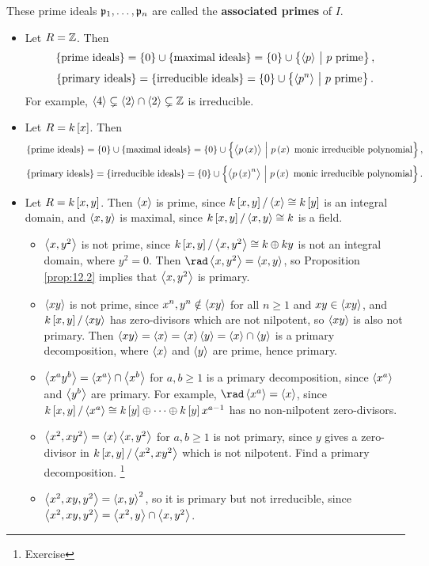 \begin{remark*}
These prime ideals $ \mathfrak{p}_1, \dots, \mathfrak{p}_n $ are called the \textbf{associated primes} of $ I $.
\end{remark*}

\begin{example*}
\hfill
\begin{itemize}
\item Let $ R = \mathbb{Z} $. Then
$$ \cbr{\text{prime ideals}} = \cbr{0} \cup \cbr{\text{maximal ideals}} = \cbr{0} \cup \cbr{\abr{p} \st p \ \text{prime}}, $$
$$ \cbr{\text{primary ideals}} = \cbr{\text{irreducible ideals}} = \cbr{0} \cup \cbr{\abr{p^n} \st p \ \text{prime}}. $$
For example, $ \left\langle 4 \right\rangle \subsetneq \left\langle 2 \right\rangle \cap \left\langle 2 \right\rangle \subsetneq \mathbb{Z} $ is irreducible.
\item Let $ R = k\sbr{x} $. Then
$$ \cbr{\text{prime ideals}} = \cbr{0} \cup \cbr{\text{maximal ideals}} = \cbr{0} \cup \cbr{\abr{p\br{x}} \st p\br{x} \ \text{monic irreducible polynomial}}, $$
$$ \cbr{\text{primary ideals}} = \cbr{\text{irreducible ideals}} = \cbr{0} \cup \cbr{\abr{p\br{x}^n} \st p\br{x} \ \text{monic irreducible polynomial}}. $$
\item Let $ R = k\sbr{x, y} $. Then $ \left\langle x \right\rangle $ is prime, since $ k\sbr{x, y} / \abr{x} \cong k\sbr{y} $ is an integral domain, and $ \left\langle x, y \right\rangle $ is maximal, since $ k\sbr{x, y} / \abr{x, y} \cong k $ is a field.
\begin{itemize}
\item $ \left\langle x, y^2 \right\rangle $ is not prime, since $ k\sbr{x, y} / \abr{x, y^2} \cong k \oplus ky $ is not an integral domain, where $ y^2 = 0 $. Then $ \rad \abr{x, y^2} = \abr{x, y} $, so Proposition \ref{prop:12.2} implies that $ \left\langle x, y^2 \right\rangle $ is primary.
\item $ \left\langle xy \right\rangle $ is not prime, since $ x^n, y^n \notin \left\langle xy \right\rangle $ for all $ n \ge 1 $ and $ xy \in \left\langle xy \right\rangle $, and $ k\sbr{x, y} / \abr{xy} $ has zero-divisors which are not nilpotent, so $ \left\langle xy \right\rangle $ is also not primary. Then $ \left\langle xy \right\rangle = \left\langle x \right\rangle = \left\langle x \right\rangle\left\langle y \right\rangle = \left\langle x \right\rangle \cap \left\langle y \right\rangle $ is a primary decomposition, where $ \left\langle x \right\rangle $ and $ \left\langle y \right\rangle $ are prime, hence primary.
\item $ \left\langle x^ay^b \right\rangle = \left\langle x^a \right\rangle \cap \left\langle x^b \right\rangle $ for $ a, b \ge 1 $ is a primary decomposition, since $ \left\langle x^a \right\rangle $ and $ \left\langle y^b \right\rangle $ are primary. For example, $ \rad \abr{x^a} = \abr{x} $, since $ k\sbr{x, y} / \abr{x^a} \cong k\sbr{y} \oplus \dots \oplus k\sbr{y}x^{a - 1} $ has no non-nilpotent zero-divisors.
\item $ \left\langle x^2, xy^2 \right\rangle = \left\langle x \right\rangle\left\langle x, y^2 \right\rangle $ for $ a, b \ge 1 $ is not primary, since $ y $ gives a zero-divisor in $ k\sbr{x, y} / \abr{x^2, xy^2} $ which is not nilpotent. Find a primary decomposition. \footnote{Exercise}
\item $ \left\langle x^2, xy, y^2 \right\rangle = \left\langle x, y \right\rangle^2 $, so it is primary but not irreducible, since $ \left\langle x^2, xy, y^2 \right\rangle = \left\langle x^2, y \right\rangle \cap \left\langle x, y^2 \right\rangle $.
\end{itemize}
\end{itemize}
\end{example*}

